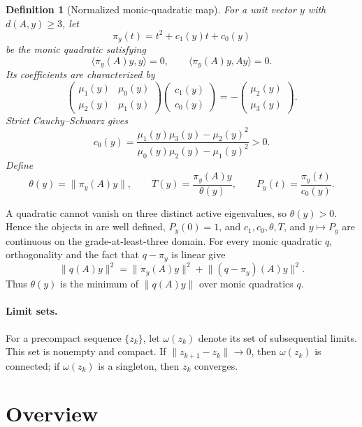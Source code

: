 \documentclass[11pt]{article}
\newtheorem{definition}[lemma]{Definition}
\begin{document}
\begin{definition}[Normalized monic-quadratic map]
\label{def:monic-map}
For a unit vector \(y\) with \(d(A,y)\geq3\), let
\[
 \pi_y(t)=t^2+c_1(y)t+c_0(y)
\]
be the monic quadratic satisfying
\[
 \langle\pi_y(A)y,y\rangle=0,\qquad
 \langle\pi_y(A)y,Ay\rangle=0.
\]
Its coefficients are characterized by
\[
 \begin{pmatrix}
   \mu_1(y)&\mu_0(y)\\
   \mu_2(y)&\mu_1(y)
 \end{pmatrix}
 \begin{pmatrix}c_1(y)\\c_0(y)\end{pmatrix}
 =
 -\begin{pmatrix}\mu_2(y)\\\mu_3(y)\end{pmatrix}.
\]
Strict Cauchy--Schwarz gives
\[
 c_0(y)=
 \frac{\mu_1(y)\mu_3(y)-\mu_2(y)^2}
      {\mu_0(y)\mu_2(y)-\mu_1(y)^2}>0.
\]
Define
\[
 \theta(y)=\lVert\pi_y(A)y\rVert,\qquad
 T(y)=\frac{\pi_y(A)y}{\theta(y)},\qquad
 P_y(t)=\frac{\pi_y(t)}{c_0(y)}.
\tag{1}\label{eq:monic-map}
\]
\end{definition}

A quadratic cannot vanish on three distinct active eigenvalues, so
\(\theta(y)>0\).  Hence the objects in
 are well defined, \(P_y(0)=1\), and
\(c_1,c_0,\theta,T\), and \(y\mapsto P_y\) are continuous on the
grade-at-least-three domain.
For every monic quadratic \(q\), orthogonality and the fact that
\(q-\pi_y\) is linear give
\[
 \lVert q(A)y\rVert^2
 =\lVert\pi_y(A)y\rVert^2+
   \lVert(q-\pi_y)(A)y\rVert^2.
\tag{2}\label{eq:monic-minimization}
\]
Thus \(\theta(y)\) is the minimum of
\(\lVert q(A)y\rVert\) over monic quadratics \(q\).

\paragraph{Limit sets.}
For a precompact sequence \(\{z_k\}\), let
\(\omega(z_k)\) denote its set of subsequential limits.  This set is
nonempty and compact.  If
\(\lVert z_{k+1}-z_k\rVert\to0\), then \(\omega(z_k)\) is connected;
if \(\omega(z_k)\) is a singleton, then \(z_k\) converges.

\section{Overview}
\label{sec:overview}
\end{document}

